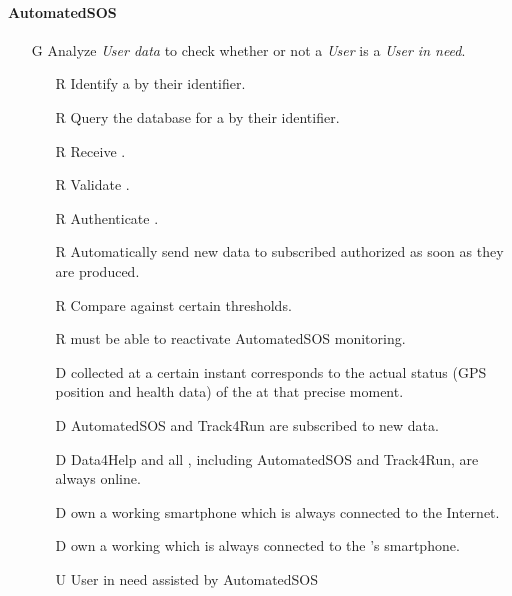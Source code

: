 \documentclass[../../rasd.tex]{subfiles}
\begin{document}
        \paragraph{AutomatedSOS}
        \begin{itemize}
            \item[G\subs{6}]Analyze \textit{User data} to check whether or not a \textit{User} is a \textit{User in need}.
            \begin{itemize}
                \item[R\subs{6}]Identify a  by their identifier.
                \item[R\subs{7}]Query the database for a  by their identifier.
                \item[R\subs{8}]Receive .
                \item[R\subs{9}]Validate .
                \item[R\subs{10}]Authenticate .
                \item[R\subs{29}]Automatically send new data to subscribed authorized  as soon as they are produced.
                \item[R\subs{36}]Compare  against certain thresholds.
                \item[R\subs{38}] must be able to reactivate AutomatedSOS monitoring.
                \\
                \item[D\subs{2}] collected at a certain instant corresponds to the actual status (GPS position and health data) of the  at that precise moment.              
                \item[D\subs{6}]AutomatedSOS and Track4Run are subscribed to new data.
                \item[D\subs{9}]Data4Help and all , including AutomatedSOS and Track4Run, are always online.
                \item[D\subs{10}] own a working smartphone which is always connected to the Internet.
                \item[D\subs{11}] own a working  which is always connected to the 's smartphone.
                \\
                \item[U\subs{11}]User in need assisted by AutomatedSOS
            \end{itemize}


\end{itemize}
\end{document}
